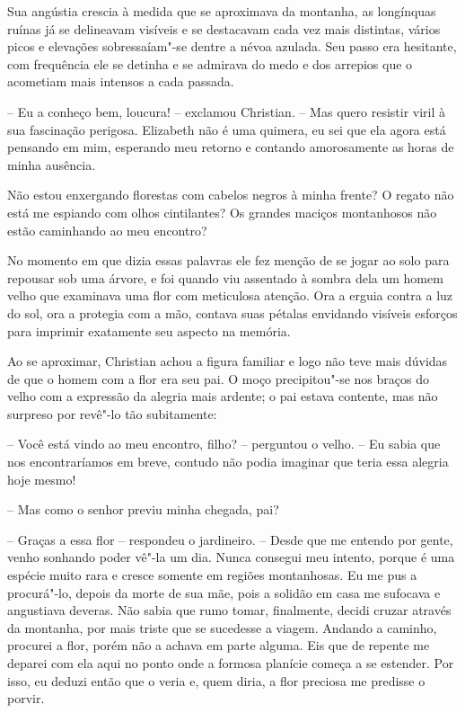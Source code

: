 Sua angústia crescia à medida que se aproximava da montanha, as
longínquas ruínas já se delineavam visíveis e se destacavam cada vez
mais distintas, vários picos e elevações sobressaíam"-se dentre a névoa
azulada. Seu passo era hesitante, com frequência ele se detinha e se
admirava do medo e dos arrepios que o acometiam mais intensos a cada
passada.

-- Eu a conheço bem, loucura! -- exclamou Christian. -- Mas quero resistir
viril à sua fascinação perigosa. Elizabeth não é uma quimera, eu sei
que ela agora está pensando em mim, esperando meu retorno e contando
amorosamente as horas de minha ausência.

Não estou enxergando florestas com cabelos negros à minha frente? O
regato não está me espiando com olhos cintilantes? Os grandes maciços
montanhosos não estão caminhando ao meu encontro?

No momento em que dizia essas palavras ele fez menção de se jogar ao
solo para repousar sob uma árvore, e foi quando viu assentado à sombra
dela um \mbox{homem} velho que examinava uma flor com meticulosa atenção. Ora
a erguia contra a luz do sol, ora a protegia com a mão, contava suas
pétalas envidando visíveis esforços para imprimir exatamente seu
aspecto na memória.

Ao se aproximar, Christian achou a figura familiar e logo não teve mais
dúvidas de que o homem com a flor era seu pai. O moço precipitou"-se nos
braços do velho com a expressão da alegria mais ardente; o pai estava
contente, mas não surpreso por revê"-lo tão subitamente:

-- Você está vindo ao meu encontro, filho? -- perguntou o velho. -- Eu
sabia que nos encontraríamos em breve, contudo não podia imaginar que
teria essa alegria hoje mesmo!

-- Mas como o senhor previu minha chegada, pai?

-- Graças a essa flor -- respondeu o jardineiro. -- Desde que me entendo
por gente, venho sonhando poder vê"-la um dia. Nunca consegui meu
intento, porque é uma espécie muito rara e cresce somente em regiões
montanhosas. Eu me pus a procurá"-lo, depois da morte de sua mãe, pois a
solidão em casa me sufocava e angustiava deveras. Não sabia que rumo
tomar, finalmente, decidi cruzar através da montanha, por mais
triste que se sucedesse a viagem. Andando a caminho, procurei a flor, porém
não a achava em parte alguma. Eis que de repente me deparei com ela
aqui no ponto onde a formosa planície começa a se estender. Por isso,
eu deduzi então que o veria e, quem diria, a flor preciosa me predisse
o porvir.


